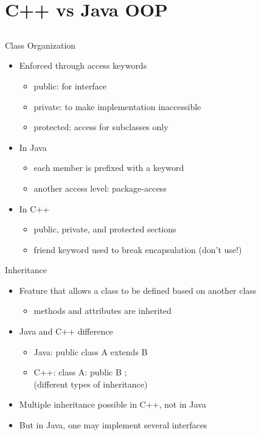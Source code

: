 \documentclass{beamer}
\begin{document}
\section{C++ vs Java OOP}
\subsection{}

\begin{frame}{Class Organization}
\begin{itemize}
\item Enforced through access keywords
\begin{itemize}
\item public: for interface
\item private: to make implementation inaccessible
\item protected: access for subclasses only
\end{itemize}
\item In Java
\begin{itemize}
\item each member is prefixed with a keyword
\item another access level:  package-access
\end{itemize}
\item In C++
\begin{itemize}
\item public, private, and protected sections
\item friend keyword used to break encapsulation (don't use!)
\end{itemize}
\end{itemize}
\end{frame}

\begin{frame}{Inheritance}
\begin{itemize}
\item Feature that allows a class to be defined based on another class
\begin{itemize}
\item methods and attributes are inherited
\end{itemize}
\item Java and C++ difference
\begin{itemize}
\item Java:  public class A extends B { }
\item C++:  class A: public B { }; \\
(different types of inheritance)
\end{itemize}
\item Multiple inheritance possible in C++, not in Java
\item But in Java, one may implement several interfaces
\end{itemize}
\end{frame}
\end{document}
